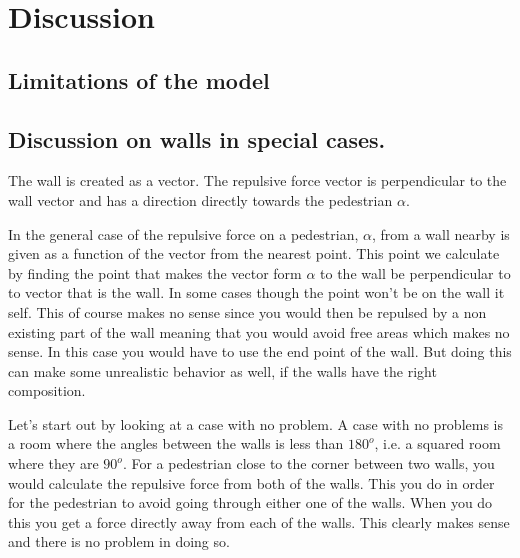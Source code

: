 \section{Discussion}\label{sec:discussion}
\subsection{Limitations of the model}

\subsection{Discussion on walls in special cases.}\label{wallEndpoints}
The wall is created as a vector. The repulsive force vector is perpendicular to the wall vector and has a direction directly towards the pedestrian $\alpha$.


In the general case of the repulsive force on a pedestrian, $\alpha$, from a wall nearby is given as a function of the vector from the nearest point. This point we calculate by finding the point that makes the vector form $\alpha$ to the wall be perpendicular to to vector that is the wall. In some cases though the point won't be on the wall it self. This of course makes no sense since you would then be repulsed by a non existing part of the wall meaning that you would avoid free areas which makes no sense. In this case you would have to use the end point of the wall. But doing this can make some unrealistic behavior as well, if the walls have the right composition. 

Let's start out by looking at a case with no problem. A case with no problems is a room where the angles between the walls is less than $180^o$, i.e. a squared room where they are $90^o$. For a pedestrian close to the corner between two walls, you would calculate the repulsive force from both of the walls. This you do in order for the pedestrian to avoid going through either one of the walls. When you do this you get a force directly away from each of the walls. This clearly makes sense and there is no problem in doing so.


